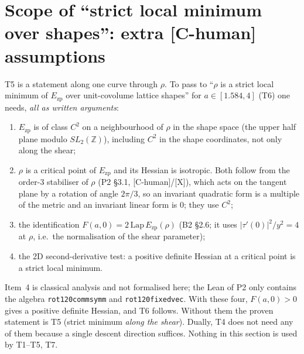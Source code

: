 \documentclass[10pt]{article}
\newcommand{\tier}[1]{\textsf{[#1]}}
\newcommand{\tX}{\tier{X}}
\newcommand{\tCh}{\tier{C-human}}
\newcommand{\lean}[1]{\texttt{#1}}
\renewcommand{\_}{\textunderscore\penalty0\hspace{0pt}}
\newcommand{\Ezp}{E_{\mathrm{zp}}}
\begin{document}
\section{Scope of ``strict local minimum over shapes'': extra \tCh{} assumptions}\label{sec:shape}
T5 is a statement along one curve through $\rho$. To pass to ``$\rho$ is a strict local minimum of $\Ezp$ over unit-covolume lattice shapes'' for $a\in[1.584,4]$ (T6) one needs, \emph{all as written arguments}:
\begin{enumerate}\itemsep=1pt
\item $\Ezp$ is of class $C^2$ on a neighbourhood of $\rho$ in the shape space (the upper half plane modulo $SL_2(\mathbb Z)$), including $C^2$ in the shape coordinates, not only along the shear;
\item $\rho$ is a critical point of $\Ezp$ and its Hessian is isotropic. Both follow from the order-3 stabiliser of $\rho$ (P2 \S3.1, \tCh/\tX), which acts on the tangent plane by a rotation of angle $2\pi/3$, so an invariant quadratic form is a multiple of the metric and an invariant linear form is $0$; they use $C^2$;
\item the identification $F(a,0)=2\,\mathrm{Lap}\,\Ezp(\rho)$ (B2 \S2.6; it uses $|\tau'(0)|^2/y^2=4$ at $\rho$, i.e.\ the normalisation of the shear parameter);
\item the 2D second-derivative test: a positive definite Hessian at a critical point is a strict local minimum.
\end{enumerate}
Item~4 is classical analysis and not formalised here; the Lean of P2 only contains the algebra \lean{rot120\_comm\_symm} and \lean{rot120\_fixed\_vec}. With these four, $F(a,0)>0$ gives a positive definite Hessian, and T6 follows. Without them the proven statement is T5 (strict minimum \emph{along the shear}). Dually, T4 does not need any of them because a single descent direction suffices.
Nothing in this section is used by T1--T5, T7.

\end{document}
